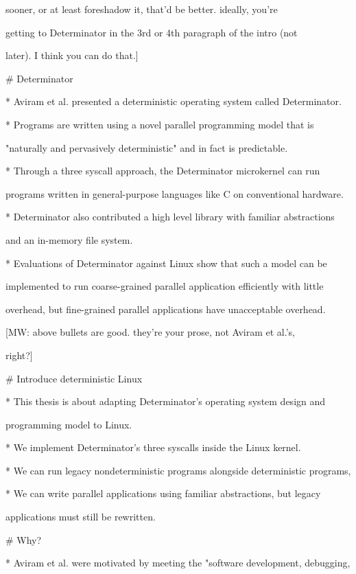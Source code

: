 sooner, or at least foreshadow it, that'd be better. ideally, you're

getting to Determinator in the 3rd or 4th paragraph of the intro (not

later). I think you can do that.]



# Determinator

* Aviram et al. presented a deterministic operating system called Determinator.

* Programs are written using a novel parallel programming model that is

  "naturally and pervasively deterministic" and in fact is predictable.

* Through a three syscall approach, the Determinator microkernel can run

  programs written in general-purpose languages like C on conventional hardware.

* Determinator also contributed a high level library with familiar abstractions

  and an in-memory file system.

* Evaluations of Determinator against Linux show that such a model can be

  implemented to run coarse-grained parallel application efficiently with little

  overhead, but fine-grained parallel applications have unacceptable overhead.



[MW: above bullets are good. they're your prose, not Aviram et al.'s,

right?]



# Introduce deterministic Linux

* This thesis is about adapting Determinator's operating system design and

  programming model to Linux.

* We implement Determinator's three syscalls inside the Linux kernel.

* We can run legacy nondeterministic programs alongside deterministic programs,

* We can write parallel applications using familiar abstractions, but legacy

  applications must still be rewritten.



# Why?

* Aviram et al. were motivated by meeting the "software development, debugging,

